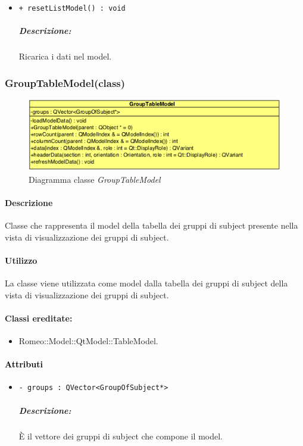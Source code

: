 {\begin{itemize}
	\item \color{blue}\verb!+ resetListModel() : void!\\
		\color{black}
		\subparagraph{Descrizione:} Ricarica i dati nel model.\\
\end{itemize}
\pagebreak


\subsubsection{GroupTableModel(class)}
\label{GroupTableModel}
\begin{figure}[!h]
	\centering
	\includegraphics[width=0.6\linewidth]{./Content/Immagini/QtModel/GroupTableModel.png}
	\caption{Diagramma classe \textsl{GroupTableModel}}
	\label{comp_GroupTableModel}
\end{figure}

\paragraph{Descrizione\\} 
Classe che rappresenta il model della tabella dei gruppi di subject\g{} presente nella vista di visualizzazione dei gruppi di subject\g{}.

\paragraph{Utilizzo\\}
La classe viene utilizzata come model dalla tabella dei gruppi di subject\g{} della vista di visualizzazione dei gruppi di subject\g{}.

\paragraph{Classi ereditate:}
\begin{itemize}
	\item Romeo::Model::QtModel::TableModel.
\end{itemize}

\paragraph{\textcolor{black}{Attributi\\}}
	\begin{itemize}
		\item \color{teal}\verb!- groups : QVector<GroupOfSubject*>!
		\color{black}
		\subparagraph{Descrizione:} È il vettore dei gruppi di subject\g{} che compone il model.
	\end{itemize}
	
}
